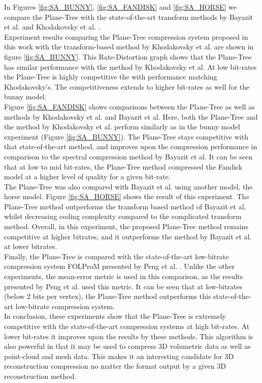 In Figures \ref{fig:SA_BUNNY}, \ref{fig:SA_FANDISK} and \ref{fig:SA_HORSE} we compare the Plane-Tree with the state-of-the-art transform methods by Bayazit et al. \cite{Bayazit103DMesh} and Khodakovsky et al. \cite{Khodakovsky00Progressive}. \\

Experiment results comparing the Plane-Tree compression system proposed in this work with the transform-based method by Khodakovsky et al. are shown in figure \ref{fig:SA_BUNNY}. This Rate-Distortion graph shows that the Plane-Tree has similar performance with the method by Khodakovsky et al. At low bit-rates the Plane-Tree is highly competitive the with performance matching Khodakovsky's. The competitiveness extends to higher bit-rates as well for the bunny model. \\

Figure \ref{fig:SA_FANDISK} shows comparisons between the Plane-Tree as well as methods by Khodakovsky et al. and Bayazit et al. Here, both the Plane-Tree and the method by Khodakovsky et al. perform similarly as in the bunny model experiment (Figure \ref{fig:SA_BUNNY}). The Plane-Tree stays competitive with that state-of-the-art method, and improves upon the compression performance in comparison to the spectral compression method by Bayazit et al. It can be seen that at low to mid bit-rates, the Plane-Tree method compressed the Fandisk model at a higher level of quality for a given bit-rate. \\

The Plane-Tree was also compared with Bayazit et al. using another model, the horse model. Figure \ref{fig:SA_HORSE} shows the result of this experiment. The Plane-Tree method outperforms the transform based method of Bayazit et al. whilst decreasing coding complexity compared to the complicated transform method. Overall, in this experiment, the proposed Plane-Tree method remains competitive at higher bitrates, and it outperforms the method by Bayazit et al. at lower bitrates. \\

Finally, the Plane-Tree is compared with the state-of-the-art low-bitrate compression system FOLProM presented by Peng et al. \cite{Peng10Feature}. Unlike the other experiments, the mean-error metric is used in this comparison, as the results presented by Peng et al. used this metric. It can be seen that at low-bitrates (below 2 bits per vertex), the Plane-Tree method outperforms this state-of-the-art low-bitrate compression system. \\


In conclusion, these experiments show that the Plane-Tree is extremely competitive with the state-of-the-art compression systems at high bit-rates. At lower bit-rates it improves upon the results by these methods. This algorithm is also powerful in that it may be used to compress 3D volumetric data as well as point-cloud and mesh data. This makes it an interesting candidate for 3D reconstruction compression no matter the format output by a given 3D reconstruction method. \\